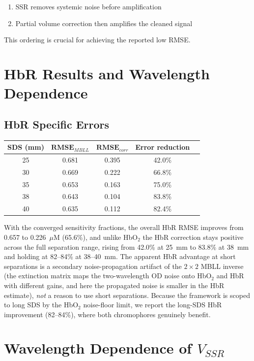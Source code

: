 \documentclass[12pt]{article}
\def\mathrm#1{#1}%
\def\text#1{#1}%
\begin{document}
\begin{enumerate}
\item SSR removes systemic noise before amplification
\item Partial volume correction then amplifies the cleaned signal
\end{enumerate}

This ordering is crucial for achieving the reported low RMSE.

\section{HbR Results and Wavelength Dependence}

\subsection{HbR Specific Errors}

\begin{center}
\begin{tabular}{ccccc}
\hline
\textbf{SDS (mm)} & $\textbf{RMSE}_{\text{MBLL}}$ & $\textbf{RMSE}_{\text{corr}}$ & \textbf{Error reduction} \\
\hline
25 & 0.681 & 0.395 & 42.0\% \\
30 & 0.669 & 0.222 & 66.8\% \\
35 & 0.653 & 0.163 & 75.0\% \\
38 & 0.643 & 0.104 & 83.8\% \\
40 & 0.635 & 0.112 & 82.4\% \\
\hline
\end{tabular}
\end{center}

With the converged sensitivity fractions, the overall HbR RMSE improves from 0.657 to 0.226~$\mu$M (65.6\%), and unlike HbO$_2$ the HbR correction stays positive across the full separation range, rising from 42.0\% at 25~mm to 83.8\% at 38~mm and holding at 82--84\% at 38--40~mm. The apparent HbR advantage at short separations is a secondary noise-propagation artifact of the $2\times2$ MBLL inverse (the extinction matrix maps the two-wavelength OD noise onto HbO$_2$ and HbR with different gains, and here the propagated noise is smaller in the HbR estimate), \emph{not} a reason to use short separations. Because the framework is scoped to long SDS by the HbO$_2$ noise-floor limit, we report the long-SDS HbR improvement (82--84\%), where both chromophores genuinely benefit.

\section{Wavelength Dependence of \texorpdfstring{$V_{\mathrm{SSR}}$}{V\_SSR}}
\end{document}
